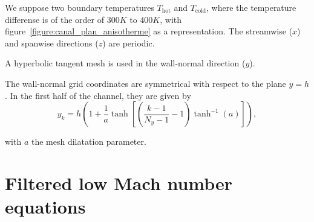 We suppose two boundary temperatures $T_{\text{hot}}$ and $T_{\text{cold}}$, where the temperature differense is of the order of $300K$ to $400K$, with figure~\ref{figure:canal_plan_anisotherme} as a representation.
The streamwise ($x$) and spanwise directions ($z$) are periodic.

A hyperbolic tangent mesh is used in the wall-normal direction ($y$).

The wall-normal grid coordinates are symmetrical with respect to the plane $y=h$. In the first half of the channel, they are given by
\begin{equation}
y_k = h \left( 1 + \frac{1}{a} \tanh\left[ \left(\frac{k-1}{N_y-1} - 1\right)\tanh^{-1}(a)\right] \right), \label{eqmesh}
\end{equation}

with $a$ the mesh dilatation parameter.

\section{Filtered low Mach number equations}\label{label-pa}

